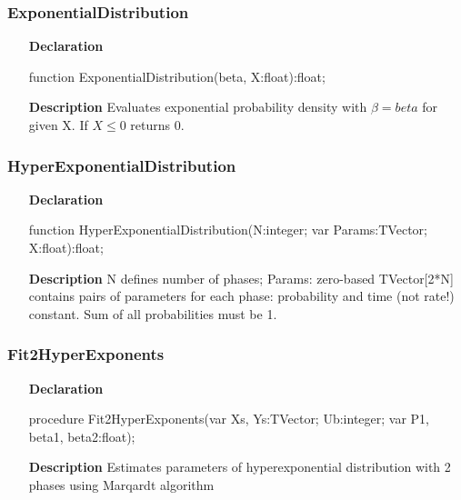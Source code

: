 \documentclass[12pt,a4paper,oneside]{report}
\newcommand{\declarationitem}[1]{\textbf{#1}}
\newcommand{\descriptiontitle}[1]{\textbf{#1}}
\begin{document}
\subsubsection{ExponentialDistribution}
\label{udistribs-ExponentialDistribution}
\begin{itemize}\item[\declarationitem{Declaration}\hfill]
	\begin{flushleft}
		\begin{ttfamily}
			function ExponentialDistribution(beta, X:float):float;\end{ttfamily}
		
	\end{flushleft}
	\item[\descriptiontitle{Description}]
	Evaluates exponential probability density with $\beta=beta$ for given X. If {$X\le 0$} returns 0.
	
\end{itemize}
\subsubsection{HyperExponentialDistribution}
\label{udistribs-HyperExponentialDistribution}
\begin{itemize}\item[\declarationitem{Declaration}\hfill]
	\begin{flushleft}
		\begin{ttfamily}
			function HyperExponentialDistribution(N:integer; var Params:TVector; X:float):float;\end{ttfamily}
		
	\end{flushleft}
	
	\par
	\item[\descriptiontitle{Description}]
	N defines number of phases; Params: zero-based TVector[2*N] contains pairs of parameters for each phase: probability and time (not rate!) constant. Sum of all probabilities must be 1.
	
\end{itemize}
\subsubsection{Fit2HyperExponents}
\label{udistribs-Fit2HyperExponents}
\begin{itemize}\item[\declarationitem{Declaration}\hfill]
	\begin{flushleft}
		\begin{ttfamily}
			procedure Fit2HyperExponents(var Xs, Ys:TVector; Ub:integer; var P1, beta1, beta2:float);\end{ttfamily}
		
	\end{flushleft}
	
	\par
	\item[\descriptiontitle{Description}]
	Estimates parameters of hyperexponential distribution with 2 phases using Marqardt algorithm
	
\end{itemize}
\end{document}
